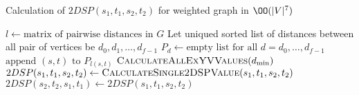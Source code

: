\begin{algorithm}
\caption{Calculation of $2DSP(s_1, t_1, s_2, t_2)$ for weighted graph in $\OO(|V|^7)$} \label{alg:n7w}
\begin{algorithmic}[1]
\State $l \gets \text{matrix of pairwise distances in }G$
\State Let uniqued sorted list of distances between all pair of vertices be $d_0, d_1, \ldots, d_{f-1}$
\State $P_d \gets \text{empty list for all }d = d_0, \ldots, d_{f-1}$
    \State $\text{append }(s, t)\text{ to }P_{l(s, t)}$
\EndFor
{}
    \State $\textsc{CalculateAllExYVValues}(d_{\min})$
                \State $2DSP(s_1, t_1, s_2, t_2) \gets \textsc{CalculateSingle2DSPValue}(s_1, t_1, s_2, t_2)$
                \State $2DSP(s_2, t_2, s_1, t_1) \gets 2DSP(s_1, t_1, s_2, t_2)$ 
            \EndFor
        \EndFor
    \EndFor
\EndFor
\EndProcedure
\Statex
\end{algorithmic}
\end{algorithm}

